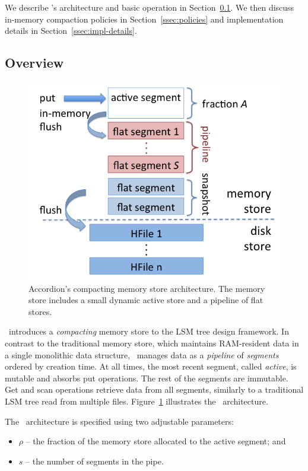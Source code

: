 
We describe  \sys's architecture and basic operation in Section~\ref{ssec:overview}.
We then discuss in-memory compaction policies  in  Section~\ref{ssec:policies}
and implementation details in Section~\ref{ssec:impl-details}. 

\subsection{Overview} \label{ssec:overview}

\begin{figure}[tbh]
\center
\includegraphics[width=0.9\columnwidth]{Accordion} 
\caption{Accordion's compacting memory store architecture. The memory store includes a small dynamic active store and a pipeline of flat stores. }
\label{fig:accordion}
\end{figure}

\sys\ introduces a \emph{compacting} memory store to the LSM tree design framework. In contrast to the traditional memory store, 
which maintains RAM-resident data in a single monolithic data structure, \sys\ manages data as a \emph{pipeline} of 
\emph{segments} ordered by creation time. At all times, the most recent segment, called \emph{active}, is mutable and absorbs 
 put operations. The rest of the segments are immutable. Get and scan operations retrieve data from all  segments, 
 similarly to a traditional LSM tree read from multiple files. Figure~\ref{fig:accordion} illustrates the \sys\ architecture. 

The \sys\ architecture is specified using two adjustable parameters:
\begin{itemize}
\item  $\rho$ -- the fraction of the memory store allocated to the active segment; and 
\item $s$ -- the number of segments in the pipe.
\end{itemize}

